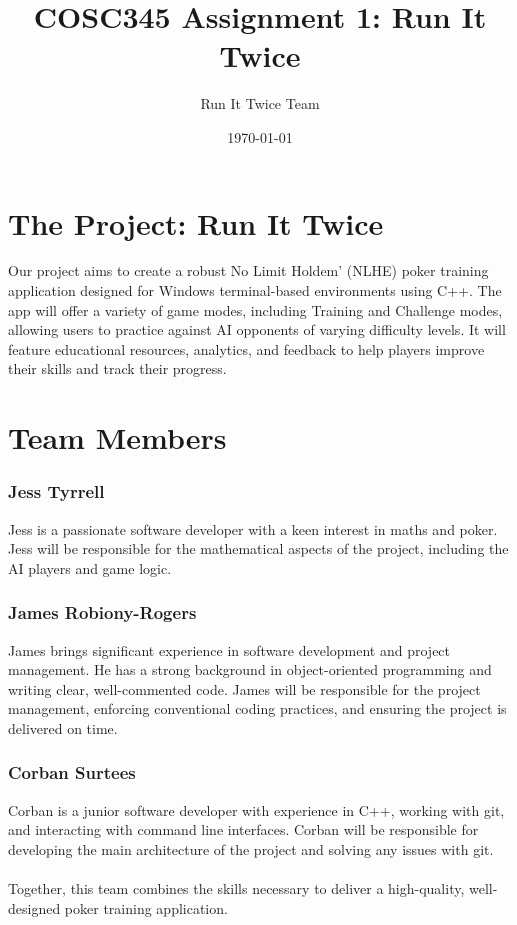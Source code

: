 \documentclass{article}
\title{COSC345 Assignment 1: Run It Twice}
\author{Run It Twice Team}
\date{\today}
\begin{document}
\maketitle

\section*{The Project: Run It Twice}
Our project aims to create a robust No Limit Holdem' (NLHE) poker training application designed for Windows terminal-based environments using C++. The app will offer a variety of game modes, including Training and Challenge modes, allowing users to practice against AI opponents of varying difficulty levels. It will feature educational resources, analytics, and feedback to help players improve their skills and track their progress.

\section*{Team Members}

\subsubsection*{Jess Tyrrell}
Jess is a passionate software developer with a keen interest in maths and poker. Jess will be responsible for the mathematical aspects of the project, including the AI players and game logic.

\subsubsection*{James Robiony-Rogers}
James brings significant experience in software development and project management. He has a strong background in object-oriented programming and writing clear, well-commented code. James will be responsible for the project management, enforcing conventional coding practices, and ensuring the project is delivered on time.

\subsubsection*{Corban Surtees}
Corban is a junior software developer with experience in C++, working with git, and interacting with command line interfaces. Corban will be responsible for developing the main architecture of the project and solving any issues with git.
\\ \\
Together, this team combines the skills necessary to deliver a high-quality, well-designed poker training application.
\end{document}
